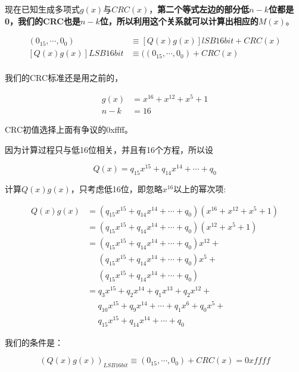 \documentclass[
]{article}
\begin{document}
现在已知生成多项式$g(x)$与$CRC(x)$，\textbf{第二个等式左边的部分低$n-k$位都是0，我们的CRC也是$n-k$位，所以利用这个关系就可以计算出相应的$M(x)$}。

\begin{equation}
\begin{aligned}
(0_{15},\cdots,0_0) &\equiv [Q(x)g(x)] lSB16bit +CRC(x)\\
 [Q(x)g(x)] LSB16bit &\equiv ((0_{15},\cdots,0_0)+CRC(x)\\
\end{aligned}
\end{equation}

我们的CRC标准还是用之前的，

\begin{equation}
\begin{aligned}
g(x)&=x^{16}+x^{12}+x^5+1\\
n-k&=16
\end{aligned}
\end{equation}

CRC初值选择上面有争议的0xffff。

因为计算过程只与低16位相关，并且有16个方程，所以设

\begin{equation}
Q(x)=q_{15}x^{15}+q_{14}x^{14}+\cdots+q_0
\end{equation}

计算$Q(x)g(x)$，只考虑低16位，即忽略$x^{16}以上的幂次项$:

\begin{equation}
\begin{aligned}
Q(x)g(x)&=(q_{15}x^{15}+q_{14}x^{14}+\cdots+q_0)(x^{16}+x^{12}+x^5+1)\\
&=(q_{15}x^{15}+q_{14}x^{14}+\cdots+q_0)(x^{12}+x^5+1)\\
&=(q_{15}x^{15}+q_{14}x^{14}+\cdots+q_0)x^{12} +\\
& \: \: \: \: \: \:(q_{15}x^{15}+q_{14}x^{14}+\cdots+q_0)x^5 +\\
& \: \: \: \: \: \:(q_{15}x^{15}+q_{14}x^{14}+\cdots+q_0)\\
&=q_3x^{15}+q_2x^{14}+q_1x^{13}+q_2x^{12}+\\
& \: \: \: \: \: \: q_{10}x^{15}+q_9x^{14}+\cdots+q_1x^{6}+q_0x^{5}+\\
& \: \: \: \: \: \: q_{15}x^{15}+q_{14}x^{14}+\cdots+q_0
\end{aligned}
\end{equation}

我们的条件是：

\begin{equation}
(Q(x)g(x))_{LSB16bit} \equiv (0_{15},\cdots,0_0)+CRC(x)=0xffff
\end{equation}
\end{document}
